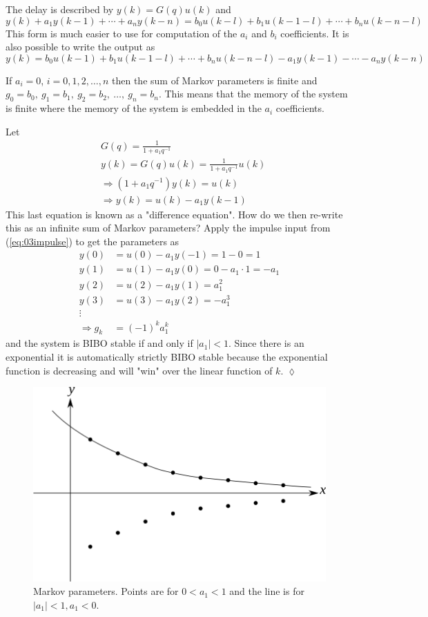 The delay is described by $y(k) = G(q)u(k)$ and
$$y(k) + a_1y(k-1)+\cdots + a_ny(k-n) = b_0u(k-l)+b_1u(k-1-l) + \cdots + b_nu(k-n-l)$$
This form is much easier to use for computation of the $a_i$ and $b_i$ coefficients. It is also possible to write the output as
$$y(k) = b_0u(k-1) + b_1u(k-1-l) + \cdots + b_nu(k-n-l) - a_1y(k-1) - \cdots - a_ny(k-n)$$

If $a_i=0$, $i=0,1,2,\ldots,n$ then the sum of Markov parameters is finite and $g_0=b_0, ~g_1=b_1, ~g_2=b_2, ~\ldots, ~g_n=b_n$. This means that the memory of the system is finite where the memory of the system is embedded in the $a_i$ coefficients.

\begin{example}
Let
\begin{align*}
&G(q) = \frac{1}{1+a_1q^{-1}} \\
&y(k) = G(q)u(k) = \frac{1}{1+a_1q^{-1}}u(k) \\
&\Rightarrow (1+a_1q^{-1})y(k) = u(k) \\
&\Rightarrow y(k) = u(k) - a_1y(k-1)
\end{align*}
This last equation is known as a "difference equation". How do we then re-write this as an infinite sum of Markov parameters? Apply the impulse input from (\ref{eq:03impulse}) to get the parameters as
\begin{align*}
y(0) &= u(0) - a_1y(-1) = 1-0 = 1 \\
y(1) &= u(1) - a_1y(0) = 0 - a_1 \cdot 1 = -a_1 \\
y(2) &= u(2) - a_1y(1) = a_1^2 \\
y(3) &= u(3) - a_1y(2) = -a_1^3 \\
\vdots & \\
\Rightarrow g_k &= (-1)^ka_1^k
\end{align*}
and the system is BIBO stable if and only if $|a_1|<1$. Since there is an exponential it is automatically strictly BIBO stable because the exponential function is decreasing and will "win" over the linear function of $k$.
$\lozenge$
\end{example}
\begin{figure}[ht!]
	\centering
	\includegraphics[width=.5\textwidth]{images/03markovParams}
	\caption{Markov parameters. Points are for $0<a_1<1$ and the line is for $|a_1|<1, a_1<0$.}
	\label{fig:03markovParams}
\end{figure}

